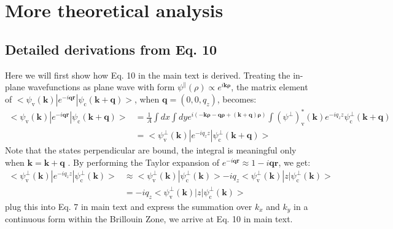 \documentclass[manuscript=suppinfo,email=true,hyperref=true,keywords=false]{achemso}
\begin{document}
\section{More theoretical analysis}
\label{eq:MG-effect-1}

\subsection{Detailed derivations from Eq. 10}
\label{sec:theory-1}

Here we will first show how Eq. 10 in the main text is
derived. Treating the in-plane wavefunctions as plane wave with form
$\psi^{\parallel}(\rho) \propto e^{i \mathbf{k \rho}}$, the matrix
element of
$<\psi_{\mathrm{v}}(\mathbf{k})|e^{-i\mathbf{qr}}|\psi_{\mathrm{c}}(\mathbf{k+q})>$,
when $\mathbf{q}=(0, 0, q_{z})$, becomes\cite{Hybertsen_1987}:
\begin{equation}
  \begin{aligned}
    \label{eq:matrix-z}
  <\psi_{\mathrm{v}}(\mathbf{k})|e^{-i\mathbf{qr}}|\psi_{\mathrm{c}}(\mathbf{k+q})>
  &= \frac{1}{A} \int dx \int dy
  e^{i(\mathbf{-k \rho} - \mathbf{q \rho} + \mathbf{(k+q) \rho})}
  \int (\psi^{\perp})^{*}_{\mathrm{v}}(\mathbf{k})e^{-iq_{z}z}\psi^{\perp}_{\mathrm{c}}(\mathbf{k+q})\\
  &= <\psi^{\perp}_{\mathrm{v}}(\mathbf{k})|e^{-iq_{z}z}|\psi^{\perp}_{\mathrm{c}}(\mathbf{k+q})>
  \end{aligned}
\end{equation}
Note that the states perpendicular are bound, the integral is
meaningful only when $\mathbf{k=k+q}$ \cite{davies_physics_1997}. By
performing the Taylor expansion of
$e^{-i\mathbf{qr}} \approx 1 - i\mathbf{qr}$, we get:
\begin{equation}
  \begin{aligned}
    \label{eq:matrix-z}
    <\psi^{\perp}_{\mathrm{v}}(\mathbf{k})|e^{-iq_{z}z}|\psi^{\perp}_{\mathrm{c}}(\mathbf{k})>
    &\approx <\psi^{\perp}_{\mathrm{v}}(\mathbf{k})|\psi^{\perp}_{\mathrm{c}}(\mathbf{k})> -
    iq_{z} <\psi^{\perp}_{\mathrm{v}}(\mathbf{k})|z|\psi^{\perp}_{\mathrm{c}}(\mathbf{k})>\\
    &= -iq_{z} <\psi^{\perp}_{\mathrm{v}}(\mathbf{k})|z|\psi^{\perp}_{\mathrm{c}}(\mathbf{k})>
   \end{aligned}
\end{equation}
plug this into Eq. 7 in main text and express the summation over
$k_{x}$ and $k_{y}$ in a continuous form within the Brillouin Zone, we
arrive at Eq. 10 in main text.
\end{document}
